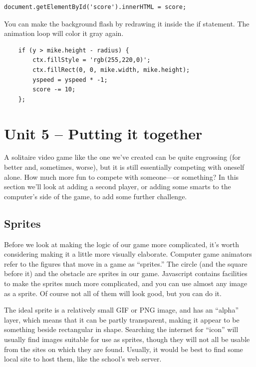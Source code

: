 \documentclass[11pt]{article}
\begin{document}
\begin{enumerate}
\begin{verbatim}
document.getElementById('score').innerHTML = score;
\end{verbatim}

You can  make the background flash by redrawing it inside the if
statement.  The animation loop will color it gray again.

\begin{verbatim}
    if (y > mike.height - radius) {
        ctx.fillStyle = 'rgb(255,220,0)';
        ctx.fillRect(0, 0, mike.width, mike.height);
        yspeed = yspeed * -1;
        score -= 10;
    };
\end{verbatim}


\end{enumerate}



\section{Unit 5 -- Putting it together}

A solitaire video game like the one we've created can be quite
engrossing (for better and, sometimes, worse), but it is still
essentially competing with oneself alone.  How much more fun to
compete with someone---or something?  In this section we'll look at
adding a second player, or adding some smarts to the computer's side
of the game, to add some further challenge.


\subsection{Sprites}
\label{sprite}

Before we look at making the logic of our game more complicated, it's
worth considering making it a little more visually elaborate.
Computer game animators refer to the figures that move in a game as
``sprites.''  The circle (and the square before it) and the obstacle
are sprites in our game.  Javascript contains facilities to make the
sprites much more complicated, and you can use almost any image as a
sprite.  Of course not all of them will look good, but you can do it.

The ideal sprite is a relatively small GIF or PNG image, and has an
``alpha'' layer, which means that it can be partly transparent, making
it appear to be something beside rectangular in shape.  Searching the
internet for ``icon'' will usually find images suitable for use as
sprites, though they will not all be usable from the sites on which
they are found.  Usually, it would be best to find some local site to
host them, like the school's web server.
\end{document}
